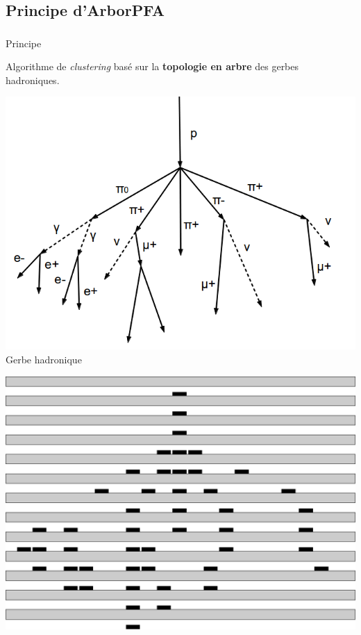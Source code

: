 \documentclass[8pt]{beamer}
\begin{document}
  \subsection{Principe d'ArborPFA}
  \begin{frame}
  \frametitle{\secname}
  \framesubtitle{\subsecname}
  \begin{block}{Principe}
    \begin{center}Algorithme de \textit{clustering} basé sur la \textbf{topologie en arbre} des gerbes hadroniques.\end{center}
  \end{block}
  \pause
  \begin{minipage}{0.325\linewidth}
    \begin{center}
      \includegraphics[width=\linewidth]{ProtonDecay.png} \\
      Gerbe hadronique
    \end{center}
  \end{minipage} \hfill
  \begin{minipage}{0.325\linewidth}
    \begin{center}
      \pause
      \includegraphics[width=\linewidth]{ProtonDecayCaloNoConnector.pdf} \\

\end{center}
\end{minipage}
\end{frame}
\end{document}

